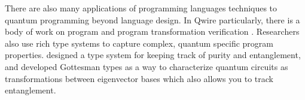 There are also many applications of programming languages techniques to quantum programming beyond language design.
In Qwire particularly, there is a body of work on program and program transformation verification .
Researchers also use rich type systems to capture complex, quantum specific program properties.
 designed a type system for keeping track of purity and entanglement, and  developed Gottesman types as a way to characterize quantum circuits as transformations between eigenvector bases which also allows you to track entanglement.

